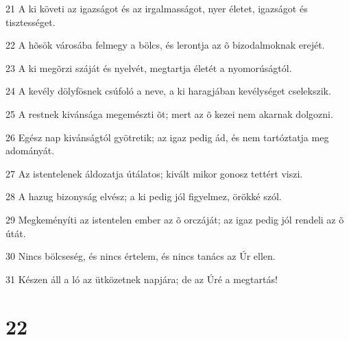 \par 21 A ki követi az igazságot és az irgalmasságot, nyer életet, igazságot és tisztességet.
\par 22 A hõsök városába felmegy a bölcs, és lerontja az õ bizodalmoknak erejét.
\par 23 A ki megõrzi száját és nyelvét, megtartja életét a nyomorúságtól.
\par 24 A kevély dölyfösnek csúfoló a neve, a ki haragjában kevélységet cselekszik.
\par 25 A restnek kivánsága megemészti õt; mert az õ kezei nem akarnak dolgozni.
\par 26 Egész nap kivánságtól gyötretik; az igaz pedig ád, és nem tartóztatja meg adományát.
\par 27 Az istentelenek áldozatja útálatos; kivált mikor gonosz tettért viszi.
\par 28 A hazug bizonyság elvész; a ki pedig jól figyelmez, örökké szól.
\par 29 Megkeményíti az istentelen ember az õ orczáját; az igaz pedig jól rendeli az õ útát.
\par 30 Nincs bölcseség, és nincs értelem, és nincs tanács az Úr ellen.
\par 31 Készen áll a ló az ütközetnek napjára; de az Úré a megtartás!

\chapter{22}

